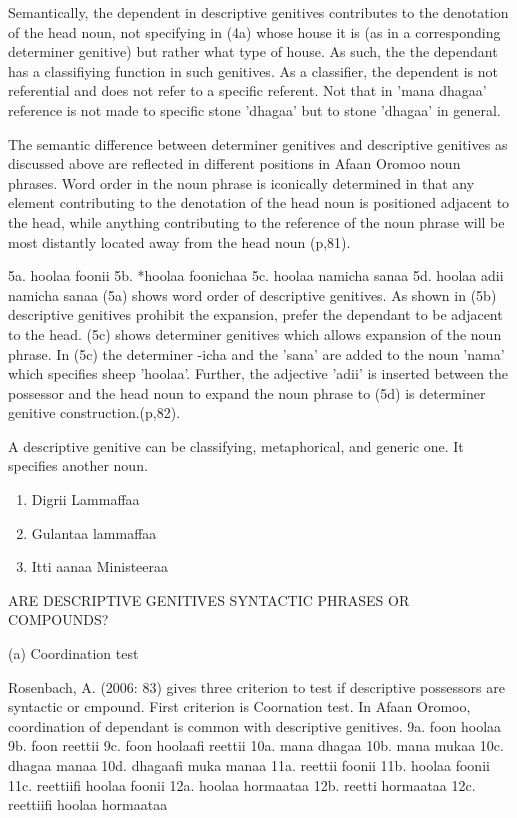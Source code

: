 \documentclass[11pt,a4paper]{article}
\begin{document}
	Semantically, the dependent in descriptive genitives contributes to the denotation of the head noun, not specifying
	in (4a) whose house it is (as in a corresponding determiner genitive) but rather what type of house. As such, the 
	the dependant has a classifiying function in such genitives. As a classifier, the dependent is not referential and
	does not refer to a specific referent. Not that in 'mana dhagaa' reference is not made to specific stone 'dhagaa' 
	but to stone 'dhagaa' in general. 
	
	The semantic difference between determiner genitives and descriptive genitives as discussed above are reflected in 
	different positions in Afaan Oromoo noun phrases. Word order in the noun phrase is iconically determined in that any element contributing 
	to the denotation of the head noun is positioned adjacent to the head, while anything contributing to the reference
	of the noun phrase will be most distantly located away from the head noun (p,81). 
	
	5a. hoolaa foonii
	5b. *hoolaa foonichaa
	5c. hoolaa namicha sanaa 
	5d. hoolaa adii namicha sanaa
	(5a) shows word order of descriptive genitives. As shown in (5b) descriptive genitives prohibit the expansion, prefer
	the dependant to be adjacent to the head. (5c) shows determiner genitives which allows expansion of the noun phrase.
	In (5c) the determiner -icha and the 'sana' are added to the noun 'nama' which specifies sheep 'hoolaa'. Further, 
	the adjective 'adii' is inserted between the possessor and the head noun to expand the noun phrase to (5d) is determiner 
	genitive construction.(p,82).
	
	A descriptive genitive can be classifying, metaphorical, and generic one. It specifies another noun. 
	\begin{enumerate}
		\item Digrii Lammaffaa
		\item Gulantaa lammaffaa
		\item Itti aanaa Ministeeraa
	\end{enumerate}
	
	
	ARE DESCRIPTIVE GENITIVES SYNTACTIC PHRASES OR COMPOUNDS?
	
	(a) Coordination test
	
	Rosenbach, A. (2006: 83) gives three criterion to test if descriptive possessors are syntactic or cmpound. 
	First criterion is Coornation test. In Afaan Oromoo, coordination of dependant is common with descriptive genitives. 
	9a. foon hoolaa
	9b. foon reettii
	9c. foon hoolaafi reettii
	10a. mana dhagaa
	10b. mana mukaa
	10c. dhagaa manaa
	10d. dhagaafi muka manaa
	11a. reettii foonii
	11b. hoolaa foonii
	11c. reettiifi hoolaa foonii
	12a. hoolaa hormaataa
	12b. reetti hormaataa
	12c. reettiifi hoolaa hormaataa
	
\end{document}
